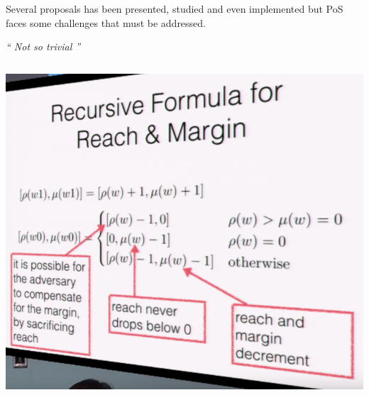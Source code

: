 \documentclass[notitlepage, usenames,dvipsnames]{beamer}
\begin{document}
\begin{frame}
\begin{overlayarea}{\textwidth}{0.85\textheight}
{        \begin{alertblock}{}
            Several proposals has been presented, studied and even implemented but PoS faces some \alert{challenges} that must be addressed.
        \end{alertblock}

    }
    
     {
        \vspace{2mm}
        \centering
        {\huge \sl{`` Not so \alert{trivial} ''}}
        
        \vspace{3ex}
        \begin{columns}[c]
            \includegraphics[scale=0.245]{../img/ouroboros-1.png}
            

\end{columns}}
\end{overlayarea}
\end{frame}
\end{document}
